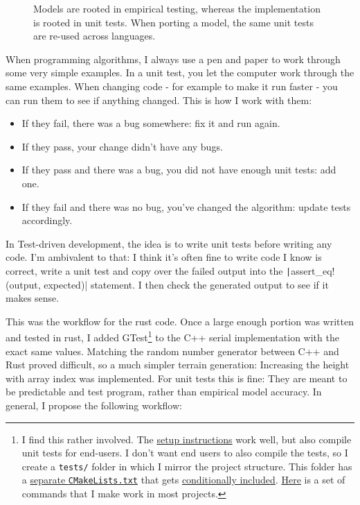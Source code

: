 \documentclass[a4paper]{article} %
\begin{document}
\begin{figure}
    \begin{center}
        
    \end{center}
    \caption{Models are rooted in empirical testing, whereas the implementation is rooted in unit tests. When porting a model, the same unit tests are re-used across languages.}\label{fig:roots}
\end{figure}

When programming algorithms, I always use a pen and paper to work through some very simple examples. In a unit test, you let the computer work through the same examples. When changing code - for example to make it run faster - you can run them to see if anything changed. This is how I work with them:

\begin{itemize}
    \item If they fail, there was a bug somewhere: fix it and run again.
    \item If they pass, your change didn't have any bugs.
    \item If they pass and there was a bug, you did not have enough unit tests: add one.
    \item If they fail and there was no bug, you've changed the algorithm: update tests accordingly.
\end{itemize}

In Test-driven development, the idea is to write unit tests before writing any code. I'm ambivalent to that: I think it's often fine to write code I know is correct, write a unit test and copy over the failed output into the
\texttt|assert_eq!(output, expected)| statement. I then check the generated output to see if it makes sense.

This was the workflow for the rust code. Once a large enough portion was written and tested in rust, I added GTest\footnote{I find this rather involved. The \href{https://google.github.io/googletest/quickstart-cmake.html\#set-up-a-project}{setup instructions} work well, but also compile unit tests for end-users. I don't want end users to also compile the tests, so I create a \texttt{tests/} folder in which I mirror the project structure. This folder has a \href{https://codeberg.org/feefladder/oxscape/src/commit/f4fc4f79f33f0d8884785b548849e701a37eb836/tests/CMakeLists.txt}{separate \texttt{CMakeLists.txt}} that gets \href{https://codeberg.org/feefladder/oxscape/src/commit/f4fc4f79f33f0d8884785b548849e701a37eb836/CMakeLists.txt\#L34}{conditionally included}. \href{https://github.com/openlandmap/scikit-map/blob/43555814495be6d99238c2bc9522fa40e04ee18c/CONTRIBUTING.md\#c-code}{Here} is a set of commands that I make work in most projects.} to the C++ serial implementation with the exact same values. Matching the random number generator between C++ and Rust proved difficult, so a much simpler terrain generation: Increasing the height with array index was implemented. For unit tests this is fine: They are meant to be predictable and test program, rather than empirical model accuracy. In general, I propose the following workflow:
\end{document}
